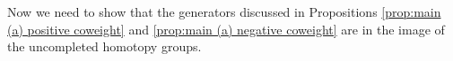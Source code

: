 \documentclass[psamsfonts]{amsart}
\newcommand{\fN}{\mathfrak N}
\newcommand{\Ext}{\mathrm {Ext}}
\theoremstyle{definition}
\theoremstyle{remark}
\newcommand{\eva}[1]
   {{\color{Periwinkle}\it #1}}
\numberwithin{equation}{section}
\begin{document}

Now we need to show that the generators discussed in Propositions \ref{prop:main (a) positive coweight} and \ref{prop:main (a) negative coweight} are in the image of the uncompleted homotopy groups.
\end{document}
